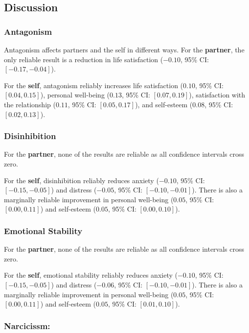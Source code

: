 \documentclass[
  singlecolumn]{article}
\begin{document}
\subsection{Discussion}\label{discussion}

\subsubsection{Antagonism}\label{antagonism}

Antagonism affects partners and the self in different ways. For the
\textbf{partner}, the only reliable result is a reduction in life
satisfaction (\(-0.10\), 95\% CI: \([-0.17, -0.04]\)).

For the \textbf{self}, antagonism reliably increases life satisfaction
(\(0.10\), 95\% CI: \([0.04, 0.15]\)), personal well-being (\(0.13\),
95\% CI: \([0.07, 0.19]\)), satisfaction with the relationship
(\(0.11\), 95\% CI: \([0.05, 0.17]\)), and self-esteem (\(0.08\), 95\%
CI: \([0.02, 0.13]\)).

\subsubsection{Disinhibition}\label{disinhibition}

For the \textbf{partner}, none of the results are reliable as all
confidence intervals cross zero.

For the \textbf{self}, disinhibition reliably reduces anxiety
(\(-0.10\), 95\% CI: \([-0.15, -0.05]\)) and distress (\(-0.05\), 95\%
CI: \([-0.10, -0.01]\)). There is also a marginally reliable improvement
in personal well-being (\(0.05\), 95\% CI: \([0.00, 0.11]\)) and
self-esteem (\(0.05\), 95\% CI: \([0.00, 0.10]\)).

\subsubsection{Emotional Stability}\label{emotional-stability}

For the \textbf{partner}, none of the results are reliable as all
confidence intervals cross zero.

For the \textbf{self}, emotional stability reliably reduces anxiety
(\(-0.10\), 95\% CI: \([-0.15, -0.05]\)) and distress (\(-0.06\), 95\%
CI: \([-0.10, -0.01]\)). There is also a marginally reliable improvement
in personal well-being (\(0.05\), 95\% CI: \([0.00, 0.11]\)) and
self-esteem (\(0.05\), 95\% CI: \([0.01, 0.10]\)).

\subsubsection{Narcicissm:}\label{narcicissm}
\end{document}
